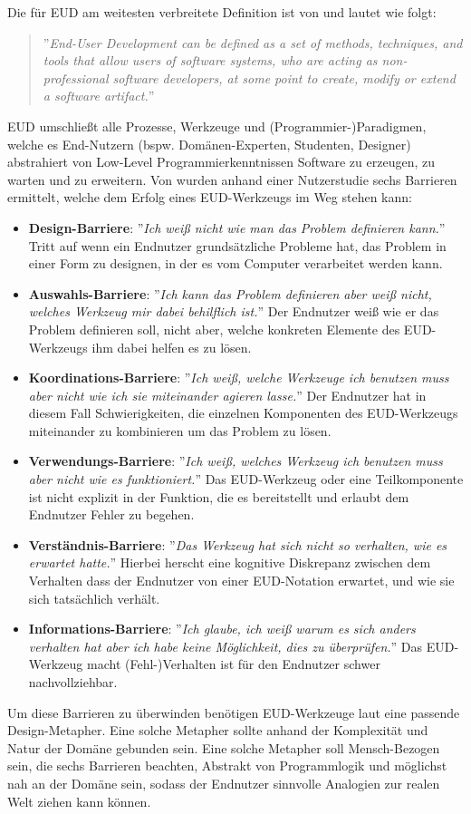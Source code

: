 Die für \ac{EUD} am weitesten verbreitete Definition ist von \cite{Lieberman.2006} und lautet wie folgt:

\begin{quote}
    ''\textit{End-User Development can be defined as a set of methods, techniques, and tools that allow users of software systems, who are acting as non-professional software developers, at some point to create, modify or extend a software artifact.}''
\end{quote}

\ac{EUD} umschließt alle Prozesse, Werkzeuge und (Programmier-)Paradigmen, welche es End-Nutzern (bspw. Domänen-Experten, Studenten, Designer) abstrahiert von Low-Level Programmierkenntnissen Software zu erzeugen, zu warten und zu erweitern. Von \cite{ko2004six} wurden anhand einer Nutzerstudie sechs Barrieren ermittelt, welche dem Erfolg eines \ac{EUD}-Werkzeugs im Weg stehen kann:
\begin{itemize}
    \item \textbf{Design-Barriere}: ''\textit{Ich weiß nicht wie man das Problem definieren kann.}'' Tritt auf wenn ein Endnutzer grundsätzliche Probleme hat, das Problem in einer Form zu designen, in der es vom Computer verarbeitet werden kann.
    \item \textbf{Auswahls-Barriere}: ''\textit{Ich kann das Problem definieren aber weiß nicht, welches Werkzeug mir dabei behilflich ist.}'' Der Endnutzer weiß wie er das Problem definieren soll, nicht aber, welche konkreten Elemente des \ac{EUD}-Werkzeugs ihm dabei helfen es zu lösen.
    \item \textbf{Koordinations-Barriere}: ''\textit{Ich weiß, welche Werkzeuge ich benutzen muss aber nicht wie ich sie miteinander agieren lasse.}'' Der Endnutzer hat in diesem Fall Schwierigkeiten, die einzelnen Komponenten des \ac{EUD}-Werkzeugs miteinander zu kombinieren um das Problem zu lösen. 
    \item \textbf{Verwendungs-Barriere}: ''\textit{Ich weiß, welches Werkzeug ich benutzen muss aber nicht wie es funktioniert.}'' Das \ac{EUD}-Werkzeug oder eine Teilkomponente ist nicht explizit in der Funktion, die es bereitstellt und erlaubt dem Endnutzer Fehler zu begehen. 
    \item \textbf{Verständnis-Barriere}: ''\textit{Das Werkzeug hat sich nicht so verhalten, wie es erwartet hatte.}'' Hierbei herscht eine kognitive Diskrepanz zwischen dem Verhalten dass der Endnutzer von einer \ac{EUD}-Notation erwartet, und wie sie sich tatsächlich verhält.
    \item \textbf{Informations-Barriere}: ''\textit{Ich glaube, ich weiß warum es sich anders verhalten hat aber ich habe keine Möglichkeit, dies zu überprüfen.}''  Das \ac{EUD}-Werkzeug macht (Fehl-)Verhalten ist für den Endnutzer schwer nachvollziehbar.
\end{itemize}
Um diese Barrieren zu überwinden benötigen \ac{EUD}-Werkzeuge laut \cite{ko2004six} eine passende Design-Metapher. Eine solche Metapher sollte anhand der Komplexität und Natur der Domäne gebunden sein. Eine solche Metapher soll Mensch-Bezogen sein, die sechs Barrieren beachten, Abstrakt von Programmlogik und möglichst nah an der Domäne sein, sodass der Endnutzer sinnvolle Analogien zur realen Welt ziehen kann können. 

